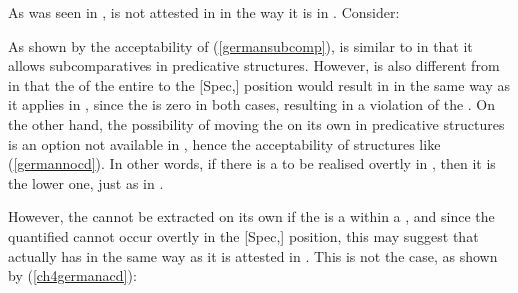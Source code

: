 As was seen in ,  is not attested in  in the way it is in . Consider:

\ea \label{germancdsub}
\z
\z

As shown by the acceptability of (\ref{germansubcomp}),  is similar to  in that it allows subcomparatives in predicative structures. However,  is also different from  in that the  of the entire  to the [Spec,] position would result in  in the same way as it applies in , since the  is zero in both cases, resulting in a violation of the . On the other hand, the possibility of moving the  on its own in predicative structures is an option not available in , hence the acceptability of structures like (\ref{germannocd}). In other words, if there is a  to be realised overtly in , then it is the lower one, just as in .

However, the  cannot be extracted on its own if the  is a  within a , and since the quantified  cannot occur overtly in the [Spec,] position, this may suggest that  actually has  in the same way as it is attested in . This is not the case, as shown by (\ref{ch4germanacd}):

\ea \label{ch4germanacd}
\z
\z

